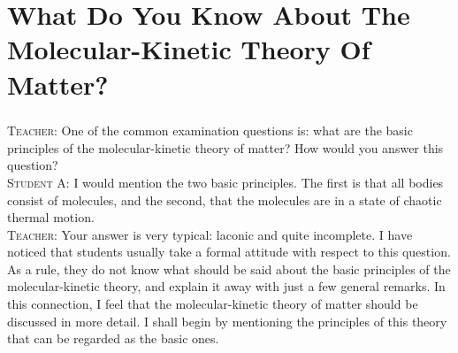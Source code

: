\documentclass[a4paper,sfsidenotes]{tufte-book}
\begin{document}
\chapter{What Do You Know About The Molecular-Kinetic Theory Of Matter?}
\label{ch-18}
\paragraph{}
\textsc{Teacher:} One of the common examination questions is: what are the basic principles of the
molecular-kinetic theory of matter? How would you answer this question?
\\
\textsc{Student A:} I would mention the two basic principles. The first is that all bodies consist of molecules, and the second, that the molecules are in a state of chaotic thermal motion.
\\
\textsc{Teacher:} Your answer is very typical: laconic and quite incomplete. I have noticed that students usually take a formal attitude with respect to this question. As a rule, they do not know what should be said about the basic principles of the molecular-kinetic theory, and explain it away with just a few general remarks. In this connection, I feel that the molecular-kinetic theory of matter should be discussed in more detail. I shall begin by mentioning the principles of this theory that can be regarded as the basic ones.
\end{document}

